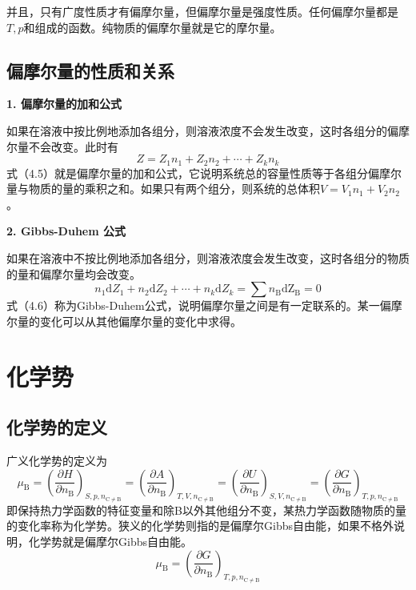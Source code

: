 \documentclass[lang=cn,newtx,11pt,scheme=chinese]{elegantbook}
\begin{document}
并且，只有广度性质才有偏摩尔量，但偏摩尔量是强度性质。任何偏摩尔量都是$T,p$和组成的函数。纯物质的偏摩尔量就是它的摩尔量。

\subsection{偏摩尔量的性质和关系}
\textbf{1. 偏摩尔量的加和公式}

如果在溶液中按比例地添加各组分，则溶液浓度不会发生改变，这时各组分的偏摩尔量不会改变。此时有
\begin{equation}
	Z = Z_1n_1+Z_2n_2+\cdots+Z_kn_k
\end{equation}
式（4.5）就是偏摩尔量的加和公式，它说明系统总的容量性质等于各组分偏摩尔量与物质的量的乘积之和。如果只有两个组分，则系统的总体积$V=V_1n_1+V_2n_2$。

\textbf{2. Gibbs-Duhem 公式}

如果在溶液中不按比例地添加各组分，则溶液浓度会发生改变，这时各组分的物质的量和偏摩尔量均会改变。
\begin{equation}
	n_1\mathrm{d}Z_1+n_2\mathrm{d}Z_2+\cdots +n_k\mathrm{d}Z_k=\sum n_\mathrm{B}\mathrm{dZ_\mathrm{B} }=0    
\end{equation}
式（4.6）称为Gibbs-Duhem公式，说明偏摩尔量之间是有一定联系的。某一偏摩尔量的变化可以从其他偏摩尔量的变化中求得。

\section{化学势}
\subsection{化学势的定义}
广义化学势的定义为
\begin{equation}
	\mu _\mathrm{B}=\left ( \frac{\partial H}{\partial n_\mathrm{B} }  \right )_{S,p,n_{\mathrm{C}\ne\mathrm{B}  }} =\left ( \frac{\partial A}{\partial n_\mathrm{B} }  \right )_{T,V,n_{\mathrm{C}\ne\mathrm{B}  }} = \left ( \frac{\partial U}{\partial n_\mathrm{B} }  \right )_{S,V,n_{\mathrm{C}\ne\mathrm{B}  }} = \left ( \frac{\partial G}{\partial n_\mathrm{B} }  \right )_{T,p,n_{\mathrm{C}\ne\mathrm{B}  }}
\end{equation}
即保持热力学函数的特征变量和除B以外其他组分不变，某热力学函数随物质的量的变化率称为化学势。狭义的化学势则指的是偏摩尔Gibbs自由能，如果不格外说明，化学势就是偏摩尔Gibbs自由能。
\begin{equation}
	\mu _\mathrm{B}=\left ( \frac{\partial G}{\partial n_\mathrm{B} }  \right )_{T,p,n_{\mathrm{C}\ne\mathrm{B}  }}
\end{equation}
\end{document}
